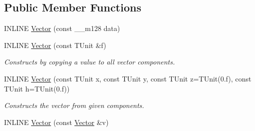 \subsection*{Public Member Functions}
\begin{DoxyCompactItemize}
\item 
I\+N\+L\+I\+NE \hyperlink{classVector_3_01TUnit_00_01d_00_01std_1_1enable__if__t_3_01IsFloatSpecialization_3_01TUnit_00_01d_01_4_01_4_01_4_a3d1a0ab7e86168769c99d4debe45e181}{Vector} (const \+\_\+\+\_\+m128 data)
\item 
\hypertarget{classVector_3_01TUnit_00_01d_00_01std_1_1enable__if__t_3_01IsFloatSpecialization_3_01TUnit_00_01d_01_4_01_4_01_4_abf7953c4eb03f32b12740e6497019637}{}\label{classVector_3_01TUnit_00_01d_00_01std_1_1enable__if__t_3_01IsFloatSpecialization_3_01TUnit_00_01d_01_4_01_4_01_4_abf7953c4eb03f32b12740e6497019637} 
I\+N\+L\+I\+NE \hyperlink{classVector_3_01TUnit_00_01d_00_01std_1_1enable__if__t_3_01IsFloatSpecialization_3_01TUnit_00_01d_01_4_01_4_01_4_abf7953c4eb03f32b12740e6497019637}{Vector} (const T\+Unit \&f)
\begin{DoxyCompactList}\small\item\em Constructs by copying a value to all vector components. \end{DoxyCompactList}\item 
\hypertarget{classVector_3_01TUnit_00_01d_00_01std_1_1enable__if__t_3_01IsFloatSpecialization_3_01TUnit_00_01d_01_4_01_4_01_4_aed2988b25f4ddc7b12b39c43a1221236}{}\label{classVector_3_01TUnit_00_01d_00_01std_1_1enable__if__t_3_01IsFloatSpecialization_3_01TUnit_00_01d_01_4_01_4_01_4_aed2988b25f4ddc7b12b39c43a1221236} 
I\+N\+L\+I\+NE \hyperlink{classVector_3_01TUnit_00_01d_00_01std_1_1enable__if__t_3_01IsFloatSpecialization_3_01TUnit_00_01d_01_4_01_4_01_4_aed2988b25f4ddc7b12b39c43a1221236}{Vector} (const T\+Unit x, const T\+Unit y, const T\+Unit z=T\+Unit(0.f), const T\+Unit h=T\+Unit(0.f))
\begin{DoxyCompactList}\small\item\em Constructs the vector from given components. \end{DoxyCompactList}\item 
\hypertarget{classVector_3_01TUnit_00_01d_00_01std_1_1enable__if__t_3_01IsFloatSpecialization_3_01TUnit_00_01d_01_4_01_4_01_4_a0e67156e369ac261a59022409708f000}{}\label{classVector_3_01TUnit_00_01d_00_01std_1_1enable__if__t_3_01IsFloatSpecialization_3_01TUnit_00_01d_01_4_01_4_01_4_a0e67156e369ac261a59022409708f000} 
I\+N\+L\+I\+NE \hyperlink{classVector_3_01TUnit_00_01d_00_01std_1_1enable__if__t_3_01IsFloatSpecialization_3_01TUnit_00_01d_01_4_01_4_01_4_a0e67156e369ac261a59022409708f000}{Vector} (const \hyperlink{classVector}{Vector} \&v)

\end{DoxyCompactItemize}
